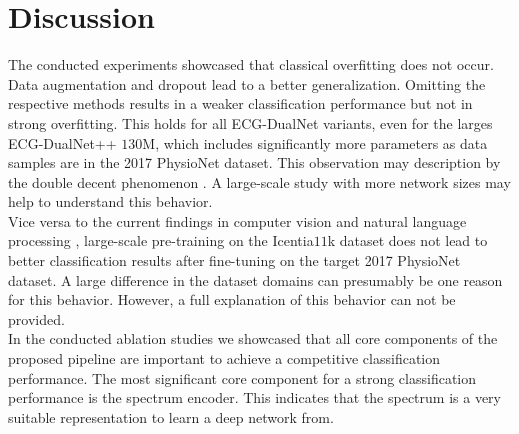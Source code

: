\section{Discussion} \label{sec:discussion}
The conducted experiments showcased that classical overfitting does not occur. Data augmentation and dropout lead to a better generalization. Omitting the respective methods results in a weaker classification performance but not in strong overfitting. This holds for all ECG-DualNet variants, even for the larges ECG-DualNet++ $130\si{\mega}$, which includes significantly more parameters as data samples are in the 2017 PhysioNet dataset. This observation may description by the double decent phenomenon \cite{Belkin2019, Nakkiran2020}. A large-scale study with more network sizes may help to understand this behavior.\\
\indent Vice versa to the current findings in computer vision \cite{Zeiler2014, Girshick2014, He2019} and natural language processing \cite{Devlin2018, Brown2020}, large-scale pre-training on the Icentia$11$k dataset does not lead to better classification results after fine-tuning on the target 2017 PhysioNet dataset. A large difference in the dataset domains can presumably be one reason for this behavior. However, a full explanation of this behavior can not be provided.\\
\indent In the conducted ablation studies we showcased that all core components of the proposed pipeline are important to achieve a competitive classification performance. The most significant core component for a strong classification performance is the spectrum encoder. This indicates that the spectrum is a very suitable representation to learn a deep network from.
